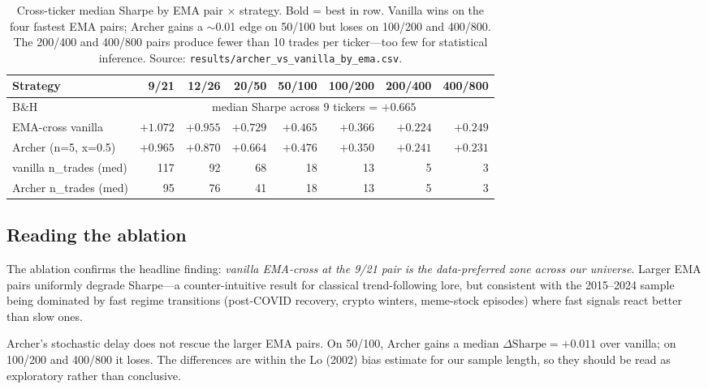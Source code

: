 \documentclass[11pt,a4paper]{article}
\begin{document}
\begin{table}[h]
\centering
\small
\begin{tabular}{lrrrrrrr}
\toprule
\textbf{Strategy} & \textbf{9/21} & \textbf{12/26} & \textbf{20/50} & \textbf{50/100} & \textbf{100/200} & \textbf{200/400} & \textbf{400/800} \\
\midrule
B\&H                & \multicolumn{7}{c}{median Sharpe across 9 tickers = $+0.665$} \\
EMA-cross vanilla   & $\mathbf{+1.072}$ & $+0.955$ & $+0.729$ & $+0.465$ & $+0.366$ & $+0.224$ & $+0.249$ \\
Archer (n=5, x=0.5) & $+0.965$          & $+0.870$ & $+0.664$ & $\mathbf{+0.476}$ & $+0.350$ & $+0.241$ & $+0.231$ \\
\midrule
vanilla n\_trades (med) & 117 & 92 & 68 & 18 & 13 & 5 & 3 \\
Archer n\_trades (med)  &  95 & 76 & 41 & 18 & 13 & 5 & 3 \\
\bottomrule
\end{tabular}
\caption{Cross-ticker median Sharpe by EMA pair × strategy. Bold = best in row. Vanilla wins on the four fastest EMA pairs; Archer gains a $\sim$0.01 edge on 50/100 but loses on 100/200 and 400/800. The 200/400 and 400/800 pairs produce fewer than 10 trades per ticker---too few for statistical inference. Source: \texttt{results/archer\_vs\_vanilla\_by\_ema.csv}.}
\label{tab:ema-ablation}
\end{table}

\subsection{Reading the ablation}

The ablation confirms the headline finding: \emph{vanilla EMA-cross at the 9/21 pair is the data-preferred zone across our universe}. Larger EMA pairs uniformly degrade Sharpe---a counter-intuitive result for classical trend-following lore, but consistent with the 2015--2024 sample being dominated by fast regime transitions (post-COVID recovery, crypto winters, meme-stock episodes) where fast signals react better than slow ones.

Archer's stochastic delay does not rescue the larger EMA pairs. On 50/100, Archer gains a median $\Delta\text{Sharpe} = +0.011$ over vanilla; on 100/200 and 400/800 it loses. The differences are within the Lo (2002) bias estimate for our sample length, so they should be read as exploratory rather than conclusive.
\end{document}
